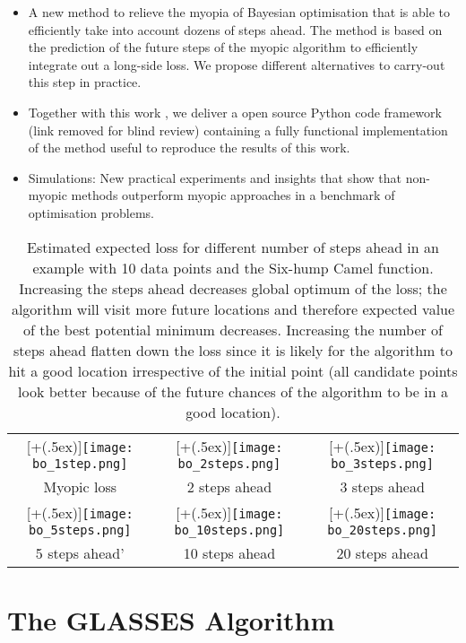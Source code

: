 \documentclass[twoside]{article}
\newcommand*{\addheight}[2][.5ex]{%
  \raisebox{0pt}[\dimexpr\height+(#1)\relax]{#2}%
}
\begin{document}
\begin{itemize}
\item A new method to relieve the myopia of Bayesian optimisation that is able to efficiently take into account dozens of steps ahead. The method is based on the prediction of the future steps of the myopic algorithm to efficiently integrate out a long-side loss. We propose different alternatives to carry-out this step in practice.
\item Together with this work , we deliver a open source Python code framework (link removed for blind review) containing a fully functional  implementation of the method useful to reproduce the results of this work.
\item Simulations: New practical experiments and insights that show that non-myopic methods outperform myopic approaches in a benchmark of optimisation problems.
\end{itemize}


\begin{table*}
\begin{tabular}{ccc}
      \addheight{\texttt{[image: bo\_1step.png]}} &
      \addheight{\texttt{[image: bo\_2steps.png]}}  &
      \addheight{\texttt{[image: bo\_3steps.png]}}\\
      \small Myopic loss &  \small 2 steps ahead & \small 3 steps ahead \\
      \addheight{\texttt{[image: bo\_5steps.png]}} &
      \addheight{\texttt{[image: bo\_10steps.png]}}  &
      \addheight{\texttt{[image: bo\_20steps.png]}}\\
      \small \small 5 steps ahead' & \small 10 steps ahead & \small 20 steps ahead \\
\end{tabular}\caption{Estimated expected loss for different number of steps ahead in an example with 10 data points and the Six-hump Camel function. Increasing the steps ahead decreases global optimum of the loss; the algorithm will visit more future locations and therefore expected value of the best potential minimum decreases. Increasing the number of steps ahead flatten down the loss since it is likely for the algorithm to hit a good location irrespective of the initial point (all candidate points look better because of the future chances of the algorithm to be in a good location).}
\end{table*}


 \section{The GLASSES  Algorithm}
\end{document}
